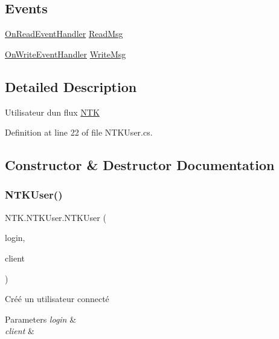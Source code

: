 \subsection*{Events}
\begin{DoxyCompactItemize}
\item 
\mbox{\hyperlink{namespace_n_t_k_a9fd65121d09e11207741ba8765106f70}{On\+Read\+Event\+Handler}} \mbox{\hyperlink{class_n_t_k_1_1_n_t_k_user_aaa37fc7deec4103a88b7a294a7d7bac0}{Read\+Msg}}
\item 
\mbox{\hyperlink{namespace_n_t_k_a664e2a81c1b642a3270f33d0848ac27e}{On\+Write\+Event\+Handler}} \mbox{\hyperlink{class_n_t_k_1_1_n_t_k_user_a7200653be03c0a22ef54b514c04b80b3}{Write\+Msg}}
\end{DoxyCompactItemize}


\subsection{Detailed Description}


Utilisateur d\textquotesingle{}un flux \mbox{\hyperlink{namespace_n_t_k}{N\+TK}} 

Definition at line 22 of file N\+T\+K\+User.\+cs.



\subsection{Constructor \& Destructor Documentation}
\mbox{\label{class_n_t_k_1_1_n_t_k_user_a0eb0ebce85f8a29328170881fe595ba0}} 
\subsubsection{\texorpdfstring{NTKUser()}{NTKUser()}\hspace{0.1cm}{\footnotesize\ttfamily [1/2]}}
{\footnotesize\ttfamily N\+T\+K.\+N\+T\+K\+User.\+N\+T\+K\+User (\begin{DoxyParamCaption}\item[{String}]{login,  }\item[{Tcp\+Client}]{client }\end{DoxyParamCaption})}



Créé un utilisateur connecté 


\begin{DoxyParams}{Parameters}
{\em login} & \\
\hline
{\em client} & \\
\hline
\end{DoxyParams}


